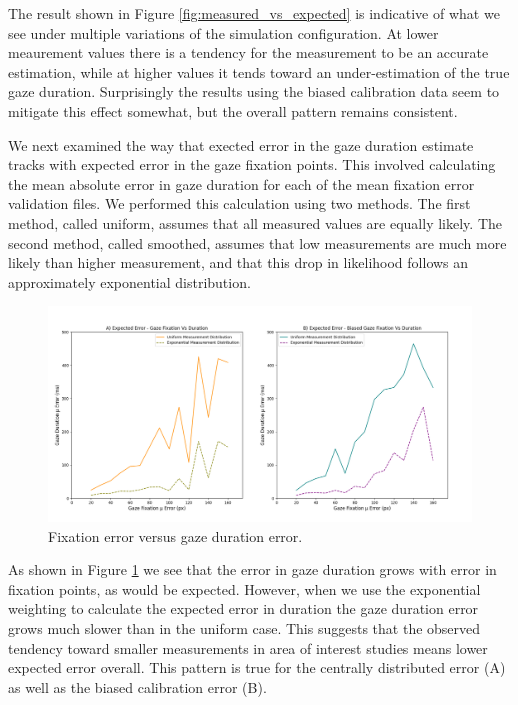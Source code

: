 \documentclass[12pt,a4paper]{article}
\numberwithin{equation}{section}
\begin{document}
The result shown in Figure \ref{fig:measured_vs_expected} is indicative of what we see under
multiple variations of the simulation configuration. At lower meaurement values there is a 
tendency for the measurement to be an accurate estimation, while at higher values it tends
toward an under-estimation of the true gaze duration. Surprisingly the results using the
biased calibration data seem to mitigate this effect somewhat, but the overall pattern 
remains consistent.

We next examined the way that exected error in the gaze duration estimate tracks with expected 
error in the gaze fixation points. This involved calculating the mean absolute error in gaze
duration for each of the mean fixation error validation files. We performed this calculation
using two methods. The first method, called uniform, assumes that all measured values are 
equally likely. The second method, called smoothed, assumes that low measurements are much
more likely than higher measurement, and that this drop in likelihood follows an approximately
exponential distribution.

\begin{figure}[h!]
\centering
\includegraphics[scale=0.4]{../results/Fixation_vs_duration_error.png}
\caption{Fixation error versus gaze duration error.}
\label{fig:fixation_vs_duration}
\end{figure}

As shown in Figure \ref{fig:fixation_vs_duration} we see that the error in gaze duration
grows with error in fixation points, as would be expected. However, when we use the exponential
weighting to calculate the expected error in duration the gaze duration error grows much slower
than in the uniform case. This suggests that the observed tendency toward smaller measurements
in area of interest studies means lower expected error overall. This pattern is true for the 
centrally distributed error (A) as well as the biased calibration error (B).
\end{document}
